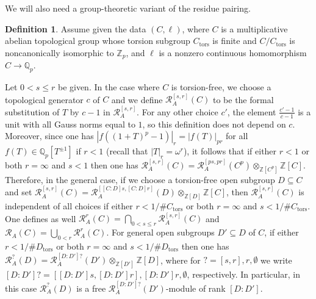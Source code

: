\documentclass[12pt]{article}
\theoremstyle{definition}
\newtheorem{defn}[theorem]{Definition}
\numberwithin{equation}{theorem}
\newcommand{\calR}{\mathcal{R}}
\newcommand{\QQ}{\mathbb{Q}}
\newcommand{\ZZ}{\mathbb{Z}}
\def\Qp{\QQ_p}
\newcommand{\tors}{\mathrm{tors}}
\newcommand{\Zp}{\ZZ_p}
\begin{document}
We will also need a group-theoretic variant of the residue pairing.

\begin{defn}\label{D:omega-Gamma}
Assume given the data $(C,\ell)$, where $C$ is a multiplicative
abelian topological group whose torsion subgroup $C_\tors$ is finite
and $C/C_\tors$ is noncanonically isomorphic to $\Zp$, and $\ell$ is a
nonzero continuous homomorphism $C \to \Qp$.

Let $0 < s \leq r$ be given.  In the case where $C$ is torsion-free,
we choose a topological generator $c$ of $C$ and we define
$\calR_A^{[s,r]}(C)$ to be the formal substitution of $T$ by $c-1$ in
$\calR_A^{[s,r]}$.  For any other choice $c'$, the element
$\frac{c'-1}{c-1}$ is a unit with all Gauss norms equal to $1$, so
this definition does not depend on $c$.  Moreover, since one has
$|f((1+T)^p-1)|_r = |f(T)|_{pr}$ for all $f(T) \in \Qp[T^{\pm1}]$ if
$r < 1$ (recall that $|T|_r = \omega^r$), it follows that if either $r
< 1$ or both $r=\infty$ and $s < 1$ then one has $\calR_A^{[s,r]}(C) =
\calR_A^{[ps,pr]}(C^p) \otimes_{\ZZ[C^p]} \ZZ[C]$.  Therefore, in the
general case, if we choose a torsion-free open subgroup $D \subseteq
C$ and set $\calR_A^{[s,r]}(C) = \calR_A^{[[C:D]s,[C:D]r]}(D)
\otimes_{\ZZ[D]} \ZZ[C]$, then $\calR_A^{[s,r]}(C)$ is independent of
all choices if either $r < 1/\#C_\tors$ or both $r=\infty$ and $s <
1/\#C_\tors$.  One defines as well $\calR_A^r(C) = \bigcap_{0 < s \leq
  r} \calR_A^{[s,r]}(C)$ and $\calR_A(C) = \bigcup_{0<r}
\calR_A^r(C)$.  For general open subgroups $D' \subseteq D$ of $C$, if
either $r < 1/\#D_\tors$ or both $r=\infty$ and $s < 1/\#D_\tors$ then
one has $\calR_A^?(D) = \calR_A^{[D:D']?}(D') \otimes_{\ZZ[D']}
\ZZ[D]$, where for $? = [s,r],r,\emptyset$ we write $[D:D']?  =
   [[D:D']s,[D:D']r], [D:D']r, \emptyset$, respectively.  In
   particular, in this case $\calR_A^?(D)$ is a free
   $\calR_A^{[D:D']?}(D')$-module of rank $[D:D']$.


\end{defn}
\end{document}
